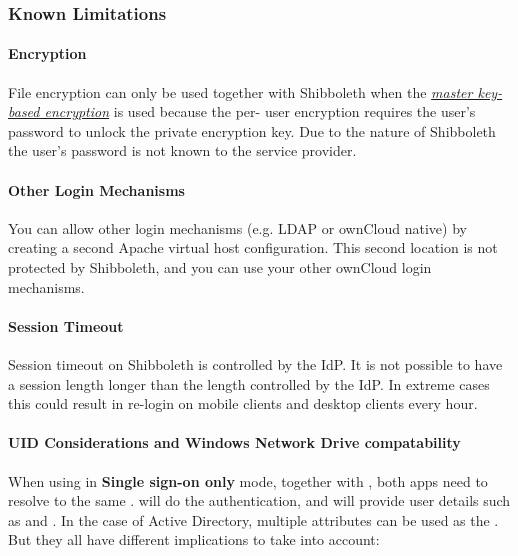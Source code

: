 \documentclass[letterpaper,10pt,english]{sphinxmanual}
\begin{document}
\subsubsection{Known Limitations}
\label{enterprise_user_management/user_auth_shibboleth:known-limitations}

\paragraph{Encryption}
\label{enterprise_user_management/user_auth_shibboleth:encryption}
File encryption can only be used together with Shibboleth when the
{\hyperref[configuration_files/encryption_configuration:occ\string-encryption\string-label]{\emph{master key-based encryption}}} is used because the
per- user encryption requires the user's password to unlock the private
encryption key. Due to the nature of Shibboleth the user's password is not known
to the service provider.


\paragraph{Other Login Mechanisms}
\label{enterprise_user_management/user_auth_shibboleth:other-login-mechanisms}
You can allow other login mechanisms (e.g. LDAP or ownCloud native) by creating
a second Apache virtual host configuration. This second location is not
protected by Shibboleth, and you can use your other ownCloud login mechanisms.


\paragraph{Session Timeout}
\label{enterprise_user_management/user_auth_shibboleth:session-timeout}
Session timeout on Shibboleth is controlled by the IdP. It is not possible to
have a session length longer than the length controlled by the IdP. In extreme
cases this could result in re-login on mobile clients and desktop clients every
hour.


\paragraph{UID Considerations and Windows Network Drive compatability}
\label{enterprise_user_management/user_auth_shibboleth:uid-considerations-and-windows-network-drive-compatability}
When using  in \textbf{Single sign-on only} mode, together with
, both apps need to resolve to the same .
 will do the authentication, and  will provide
user details such as  and . In the case of Active
Directory, multiple attributes can be used as the . But they all have
different implications to take into account:
\end{document}
